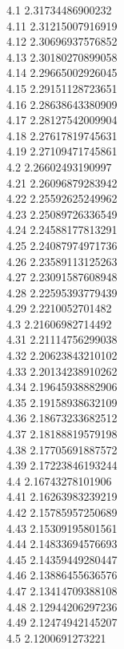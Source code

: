 {4.1	2.31734486900232\\
4.11	2.31215007916919\\
4.12	2.30696937576852\\
4.13	2.30180270899058\\
4.14	2.29665002926045\\
4.15	2.29151128723651\\
4.16	2.28638643380909\\
4.17	2.28127542009904\\
4.18	2.27617819745631\\
4.19	2.27109471745861\\
4.2	2.26602493190997\\
4.21	2.26096879283942\\
4.22	2.25592625249962\\
4.23	2.25089726336549\\
4.24	2.24588177813291\\
4.25	2.24087974971736\\
4.26	2.23589113125263\\
4.27	2.23091587608948\\
4.28	2.22595393779439\\
4.29	2.2210052701482\\
4.3	2.21606982714492\\
4.31	2.21114756299038\\
4.32	2.20623843210102\\
4.33	2.20134238910262\\
4.34	2.19645938882906\\
4.35	2.19158938632109\\
4.36	2.18673233682512\\
4.37	2.18188819579198\\
4.38	2.17705691887572\\
4.39	2.17223846193244\\
4.4	2.16743278101906\\
4.41	2.16263983239219\\
4.42	2.15785957250689\\
4.43	2.15309195801561\\
4.44	2.14833694576693\\
4.45	2.14359449280447\\
4.46	2.13886455636576\\
4.47	2.13414709388108\\
4.48	2.12944206297236\\
4.49	2.12474942145207\\
4.5	2.1200691273221\\
}
